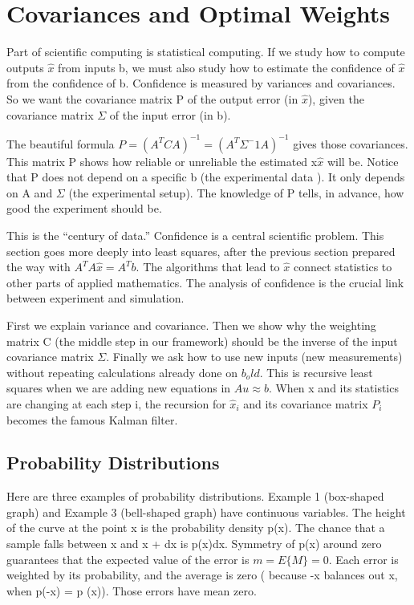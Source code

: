 \section{Covariances and Optimal Weights}
Part of scientific computing is statistical computing. If we study how to compute outputs $\hat{x}$ from inputs b, we must also study how to estimate the confidence of $\hat{x}$ from the confidence of b. Confidence is measured by variances and covariances. So we want the covariance
matrix P of the output error (in $\hat{x}$), given the covariance matrix $\Sigma$ of the input error (in b).

The beautiful formula $P=(A^TCA)^{-1}=(A^T\Sigma^-1A)^{-1}$ gives those covariances.
This matrix P shows how reliable or unreliable the estimated x$\hat{x}$ will be. Notice that P
does not depend on a specific b (the experimental data ). It only depends on A and $\Sigma$
(the experimental setup). The knowledge of P tells, in advance, how good the experiment
should be.

This is the “century of data.” Confidence is a central scientific problem. This section goes more deeply into least squares, after the previous section prepared the way with
$A^TA\hat{x}=A^Tb$. The algorithms that lead to $\hat{x}$ connect statistics to other parts of applied mathematics. The analysis of confidence is the crucial link between experiment and simulation.

First we explain variance and covariance. Then we show why the weighting matrix C
(the middle step in our framework) should be the inverse of the input covariance matrix $\Sigma$. Finally we ask how to use new inputs (new measurements) without repeating calculations already done on $b_old$. This is recursive least squares when we are adding new equations in $Au\approx b$. When x and its statistics are changing at each step i, the recursion for $\hat{x}_i$ and its covariance matrix $P_i$ becomes the famous Kalman filter.

	\subsection{Probability Distributions}
	Here are three examples of probability distributions. Example 1 (box-shaped graph) and
	Example 3 (bell-shaped graph) have continuous variables. The height of the curve at the
	point x is the probability density p(x). The chance that a sample falls between x and
	x + dx is p(x)dx. Symmetry of p(x) around zero guarantees that the expected value of
	the error is $m=E\{M\}=0$. Each error is weighted by its probability, and the average is
	zero ( because -x balances out x, when p(-x) = p (x)). Those errors have mean zero.
	
